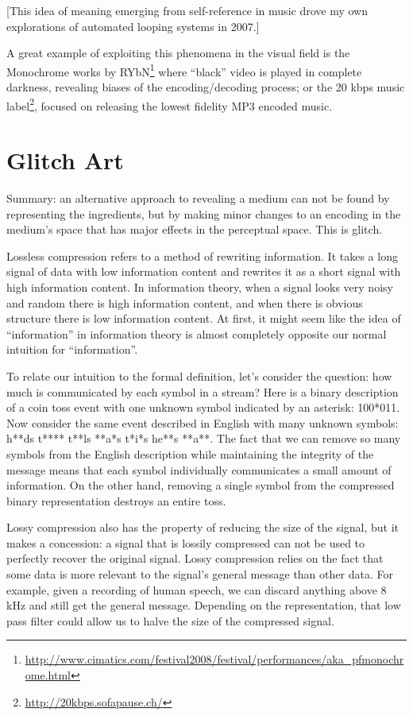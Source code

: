 \documentclass{thesis}
\begin{document}
	[This idea of meaning emerging from self-reference in music drove my own explorations of automated looping systems in 2007.]
	
	A great example of exploiting this phenomena in the visual field is the Monochrome works by RYbN\footnote{\url{http://www.cimatics.com/festival2008/festival/performances/aka_pfmonochrome.html}} where ``black'' video is played in complete darkness, revealing biases of the encoding/decoding process; or the 20 kbps music label\footnote{\url{http://20kbps.sofapause.ch/}}, focused on releasing the lowest fidelity MP3 encoded music.
	
\section{Glitch Art}
	Summary: an alternative approach to revealing a medium can not be found by representing the ingredients, but by making minor changes to an encoding in the medium's space that has major effects in the perceptual space. This is glitch.
	
	Lossless compression refers to a method of rewriting information. It takes a long signal of data with low information content and rewrites it as a short signal with high information content. In information theory, when a signal looks very noisy and random there is high information content, and when there is obvious structure there is low information content. At first, it might seem like the idea of ``information'' in information theory is almost completely opposite our normal intuition for ``information''.
	
	To relate our intuition to the formal definition, let's consider the question: how much is communicated by each symbol in a stream? Here is a binary description of a coin toss event with one unknown symbol indicated by an asterisk: 100*011. Now consider the same event described in English with many unknown symbols: h**ds t**** t**ls **a*s t*i*s he**s **a**. The fact that we can remove so many symbols from the English description while maintaining the integrity of the message means that each symbol individually communicates a small amount of information. On the other hand, removing a single symbol from the compressed binary representation destroys an entire toss.
	
	Lossy compression also has the property of reducing the size of the signal, but it makes a concession: a signal that is lossily compressed can not be used to perfectly recover the original signal. Lossy compression relies on the fact that some data is more relevant to the signal's general message than other data. For example, given a recording of human speech, we can discard anything above 8 kHz and still get the general message. Depending on the representation, that low pass filter could allow us to halve the size of the compressed signal.
	
\end{document}
